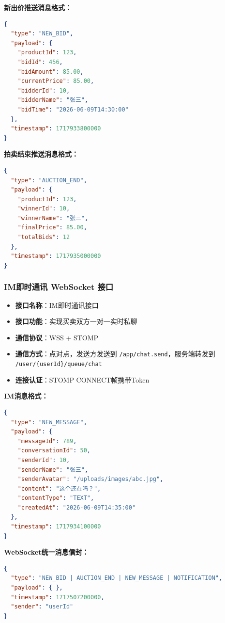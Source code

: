 \documentclass[12pt,a4paper]{ctexart}
\numberwithin{figure}{section}
\numberwithin{table}{section}
\begin{document}
\textbf{新出价推送消息格式：}

\begin{lstlisting}[language=json]
{
  "type": "NEW_BID",
  "payload": {
    "productId": 123,
    "bidId": 456,
    "bidAmount": 85.00,
    "currentPrice": 85.00,
    "bidderId": 10,
    "bidderName": "张三",
    "bidTime": "2026-06-09T14:30:00"
  },
  "timestamp": 1717933800000
}
\end{lstlisting}

\textbf{拍卖结束推送消息格式：}

\begin{lstlisting}[language=json]
{
  "type": "AUCTION_END",
  "payload": {
    "productId": 123,
    "winnerId": 10,
    "winnerName": "张三",
    "finalPrice": 85.00,
    "totalBids": 12
  },
  "timestamp": 1717935000000
}
\end{lstlisting}

\subsubsection{IM即时通讯 WebSocket 接口}

\begin{itemize}
    \item \textbf{接口名称}：IM即时通讯接口
    \item \textbf{接口功能}：实现买卖双方一对一实时私聊
    \item \textbf{通信协议}：WSS + STOMP
    \item \textbf{通信方式}：点对点，发送方发送到 \verb|/app/chat.send|，服务端转发到 \verb|/user/{userId}/queue/chat|
    \item \textbf{连接认证}：STOMP CONNECT帧携带Token
\end{itemize}

\textbf{IM消息格式：}

\begin{lstlisting}[language=json]
{
  "type": "NEW_MESSAGE",
  "payload": {
    "messageId": 789,
    "conversationId": 50,
    "senderId": 10,
    "senderName": "张三",
    "senderAvatar": "/uploads/images/abc.jpg",
    "content": "这个还在吗？",
    "contentType": "TEXT",
    "createdAt": "2026-06-09T14:35:00"
  },
  "timestamp": 1717934100000
}
\end{lstlisting}

\textbf{WebSocket统一消息信封：}

\begin{lstlisting}[language=json]
{
  "type": "NEW_BID | AUCTION_END | NEW_MESSAGE | NOTIFICATION",
  "payload": { },
  "timestamp": 1717507200000,
  "sender": "userId"
}
\end{lstlisting}
\end{document}
